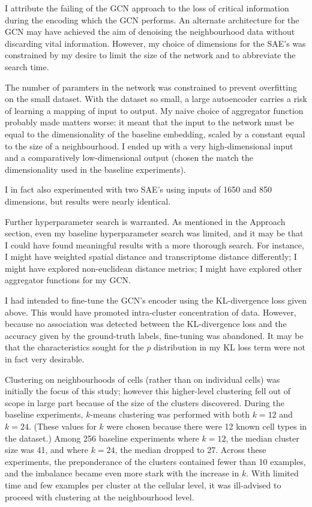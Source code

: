 \documentclass{article}
\begin{document}
I attribute the failing of the GCN approach to the loss of critical information during the encoding which the GCN performs. An alternate architecture for the GCN may have achieved the aim of denoising the neighbourhood data without discarding vital information. However, my choice of dimensions for the SAE's was constrained by my desire to limit the size of the network and to abbreviate the search time.

The number of paramters in the network was constrained to prevent overfitting on the small dataset. With the dataset so small, a large autoencoder carries a risk of learning a mapping of input to output. My naive choice of aggregator function probably made matters worse: it meant that the input to the network must be equal to the dimensionality of the baseline embedding, scaled by a constant equal to the size of a neighbourhood. I ended up with a very high-dimensional input and a comparatively low-dimensional output (chosen the match the dimensionality used in the baseline experiments).

I in fact also experimented with two SAE's using inputs of 1650 and 850 dimensions, but results were nearly identical.

Further hyperparameter search is warranted. As mentioned in the Approach section, even my baseline hyperparameter search was limited, and it may be that I could have found meaningful results with a more thorough search. For instance, I might have weighted spatial distance and transcriptome distance differently; I might have explored non-euclidean distance metrics; I might have explored other aggregator functions for my GCN.

I had intended to fine-tune the GCN's encoder using the KL-divergence loss given above. This would have promoted intra-cluster concentration of data. However, because no association was detected between the KL-divergence loss and the accuracy given by the ground-truth labels, fine-tuning was abandoned. It may be that the characteristics sought for the $p$ distribution in my KL loss term were not in fact very desirable.

Clustering on neighbourhoods of cells (rather than on individual cells) was initially the focus of this study; however this higher-level clustering fell out of scope in large part because of the size of the clusters discovered. During the baseline experiments, $k$-means clustering was performed with both $k=12$ and $k=24$. (These values for $k$ were chosen because there were 12 known cell types in the dataset.) Among 256 baseline experiments where $k = 12$, the median cluster size was 41, and where $k = 24$, the median dropped to 27. Across these experiments, the preponderance of the clusters contained fewer than 10 examples, and the imbalance became even more stark with the increase in $k$. With limited time and few examples per cluster at the cellular level, it was ill-advised to proceed with clustering at the neighbourhood level.
\end{document}
